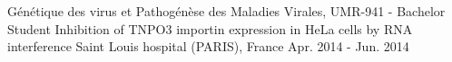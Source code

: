 \begin{cventries}
  \cventry
    {Génétique des virus et Pathogénèse des Maladies Virales, UMR-941 - Bachelor Student} %
    {Inhibition of TNPO3 importin expression in HeLa cells by RNA interference} %
    {Saint Louis hospital (PARIS), France} %
    {Apr. 2014 - Jun. 2014} %
    {
      \begin{cvitems} %
      \end{cvitems}
    }

\end{cventries}
